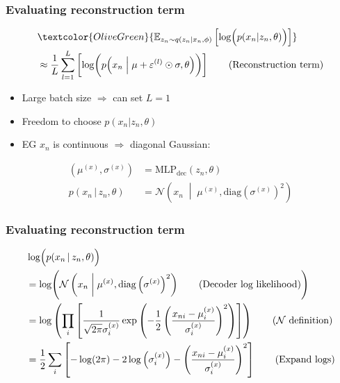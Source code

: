 \documentclass[xcolor=table,dvipsnames]{beamer}
\begin{document}
\begin{frame}
    \frametitle{Evaluating reconstruction term}
    \begin{align*}
        & \textcolor{OliveGreen}{\mathbb{E}_{z_n\sim q(z_n \vert x_n, \phi)}\left[ \log \Bigl(p(x_n \vert z_n, \theta)\Bigr) \right]} \\
        &\approx \frac{1}{L}\sum_{l=1}^L\left[ \log \biggl(p\Bigl(x_n \Bigm\vert \mu + \varepsilon^{(l)} \odot \sigma, \theta\Bigr)\biggr) \right] \tag{Reconstruction term}
    \end{align*}
    \begin{itemize}
        \setlength{\itemsep}{0.5em}
        \item Large batch size $\Rightarrow$ can set $L=1$ \cite{kingma2013auto}
        \item Freedom to choose $p(x_n\vert z_n,\theta)$
        \item EG $x_n$ is continuous $\Rightarrow$ diagonal Gaussian:
    \end{itemize}
    \begin{align*}
        \left(\mu^{(x)}, \sigma^{(x)}\right) &= \text{MLP}_\text{dec}(z_n, \theta) \tag{Decoder forward} \\
        p(x_n \,\vert\, z_n, \theta) &= \mathcal{N}\left( x_n \;\middle\vert\; \mu^{(x)}, \text{diag}\left(\sigma^{(x)}\right)^2 \right) \tag{Decoder distribution}
    \end{align*}
\end{frame}

\begin{frame}
    \frametitle{Evaluating reconstruction term}
    \begin{align*}
        &\log\Bigl( p(x_n \,\vert\, z_n, \theta) \Bigr) \\
        &= \log\Biggl(\mathcal{N}\left( x_n \;\middle\vert\; \mu^{(x)}, \text{diag}\left(\sigma^{(x)}\right)^2 \right) \tag{Decoder log likelihood}\Biggr) \\
        &= \log\left( \prod_i\left[ \frac{1}{\sqrt{2\pi}\sigma^{(x)}_i} \exp\left(-\frac{1}{2}\left(\frac{x_{ni}-\mu^{(x)}_i}{\sigma^{(x)}_i}\right)^2\right) \right] \right) \tag{$\mathcal{N}$ definition} \\
        &= \frac{1}{2}\sum_i\left[ -\log(2\pi) - 2\log\left( \sigma^{(x)}_i \right) - \left(\frac{x_{ni}-\mu^{(x)}_i}{\sigma^{(x)}_i}\right)^2 \right] \tag{Expand logs}
    \end{align*}
\end{frame}
\end{document}
